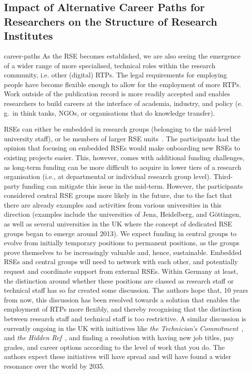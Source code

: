 \documentclass{eceasst}
\newcommand{\eg}{e.\,g.}
\begin{document}
\subsection{Impact of Alternative Career Paths for Researchers on the Structure of Research Institutes}
\begin{whatis}{}{career-paths}
As the RSE becomes established, we are also seeing the emergence of a wider range of more specialised, technical roles within the research community, i.e. other (digital) RTPs.
The legal requirements for employing people have become flexible enough to allow for the employment of more RTPs.
Work outside of the publication record is more readily accepted and enables researchers to build careers at the interface of academia, industry, and policy
(\eg\ in think tanks, NGOs, or organisations that do knowledge transfer).
\end{whatis}
RSEs can either be embedded in research groups (belonging to the mid-level university staff),
or be members of larger RSE units~\cite{Kempf2025-draft}.
The participants had the opinion that focusing on embedded RSEs would make onboarding new RSEs to existing projects easier.
This, however, comes with additional funding challenges,
as long-term funding can be more difficult to acquire in lower tiers of a research organisation (i.e., at departmental or individual research group level).
Third-party funding can mitigate this issue in the mid-term.
However, the participants considered central RSE groups more likely in the future,
due to the fact that there are already examples and activities from various universities in this direction
(examples include the universities of Jena, Heidelberg, and Göttingen, as well as several universities
in the UK where the concept of dedicated RSE groups began to emerge around 2013).
We expect funding in central groups to evolve from initially temporary positions to permanent positions,
as the groups prove themselves to be increasingly valuable and, hence, sustainable.
Embedded RSEs and central groups will need to network with each other,
and potentially request and coordinate support from external RSEs.
Within Germany at least, the distinction around whether these positions are classed as research staff or technical staff has so far created some discussion.
The authors hope that, 10 years from now, this discussion has been resolved towards a solution that enables the employment of RTPs more flexibly,
and thereby recognising that the distinction between research staff and technical staff is too restrictive.
A similar discussion is currently ongoing in the UK with initiatives like \emph{the Technician's Commitment}~\cite{techniciancommitment}, and \emph{the Hidden Ref}~\cite{hiddenref},
and finding a resolution with having new job titles, pay grades, and career options according to the level of work that you do.
The authors expect these initiatives will have spread and will have found a wider resonance over the world by 2035.
\end{document}
